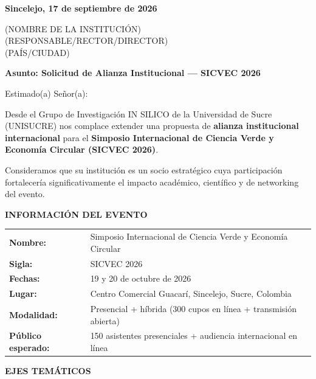 \documentclass[12pt,a4paper]{article}
\begin{document}
\vspace{0.5cm}

\noindent
\textbf{Sincelejo, 17 de septiembre de 2026}

\vspace{0.8cm}

\noindent
(NOMBRE DE LA INSTITUCIÓN)\\
(RESPONSABLE/RECTOR/DIRECTOR)\\
(PAÍS/CIUDAD)

\vspace{0.8cm}

\noindent
\textbf{\large Asunto: Solicitud de Alianza Institucional — SICVEC 2026}

\vspace{0.8cm}

Estimado(a) Señor(a):

\vspace{0.8cm}

Desde el Grupo de Investigación IN SILICO de la Universidad de Sucre (UNISUCRE) nos complace extender una propuesta de \textbf{alianza institucional internacional} para el \textbf{Simposio Internacional de Ciencia Verde y Economía Circular (SICVEC 2026)}.

Consideramos que su institución es un socio estratégico cuya participación fortalecería significativamente el impacto académico, científico y de networking del evento.

\vspace{0.5cm}

\noindent
\textbf{INFORMACIÓN DEL EVENTO}

\begin{tabular}{ll}
\textbf{Nombre:} & Simposio Internacional de Ciencia Verde y Economía Circular \\
\textbf{Sigla:} & SICVEC 2026 \\
\textbf{Fechas:} & 19 y 20 de octubre de 2026 \\
\textbf{Lugar:} & Centro Comercial Guacarí, Sincelejo, Sucre, Colombia \\
\textbf{Modalidad:} & Presencial + híbrida (300 cupos en línea + transmisión abierta) \\
\textbf{Público esperado:} & 150 asistentes presenciales + audiencia internacional en línea \\
\end{tabular}

\vspace{0.5cm}

\noindent
\textbf{EJES TEMÁTICOS}
\end{document}
